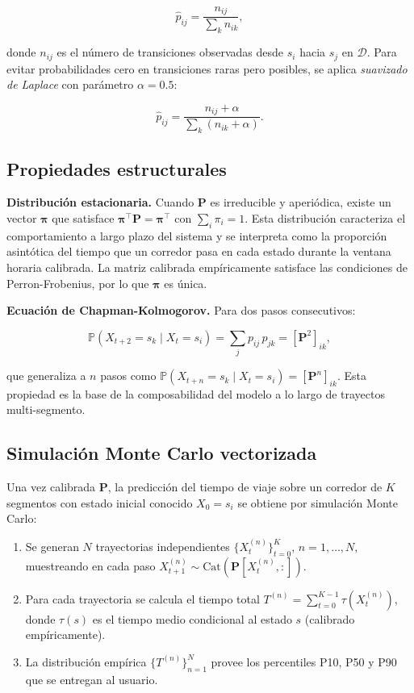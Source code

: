 \documentclass[11pt,a4paper]{article}
\newcommand{\Prob}{\mathbb{P}}
\begin{document}
\begin{equation}
\hat{p}_{ij} = \frac{n_{ij}}{\sum_k n_{ik}},
\end{equation}

donde $n_{ij}$ es el número de transiciones observadas desde
$s_i$ hacia $s_j$ en $\mathcal{D}$. Para evitar probabilidades
cero en transiciones raras pero posibles, se aplica
\emph{suavizado de Laplace} con parámetro $\alpha = 0.5$:

\begin{equation}
\hat{p}_{ij} = \frac{n_{ij} + \alpha}{\sum_k (n_{ik} + \alpha)}.
\end{equation}

\subsection{Propiedades estructurales}

\textbf{Distribución estacionaria.} Cuando $\mathbf{P}$ es
irreducible y aperiódica, existe un vector $\bm{\pi}$ que
satisface $\bm{\pi}^\top \mathbf{P} = \bm{\pi}^\top$ con
$\sum_i \pi_i = 1$. Esta distribución caracteriza el
comportamiento a largo plazo del sistema y se interpreta como la
proporción asintótica del tiempo que un corredor pasa en cada
estado durante la ventana horaria calibrada. La matriz calibrada
empíricamente satisface las condiciones de Perron-Frobenius, por
lo que $\bm{\pi}$ es única.

\textbf{Ecuación de Chapman-Kolmogorov.} Para dos pasos
consecutivos:

\begin{equation}
\Prob(X_{t+2}=s_k \mid X_t=s_i) = \sum_j p_{ij}\, p_{jk} =
[\mathbf{P}^2]_{ik},
\end{equation}

que generaliza a $n$ pasos como $\Prob(X_{t+n}=s_k \mid X_t=s_i)
= [\mathbf{P}^n]_{ik}$. Esta propiedad es la base de la
composabilidad del modelo a lo largo de trayectos multi-segmento.

\subsection{Simulación Monte Carlo vectorizada}

Una vez calibrada $\mathbf{P}$, la predicción del tiempo de viaje
sobre un corredor de $K$ segmentos con estado inicial conocido
$X_0 = s_i$ se obtiene por simulación Monte Carlo:

\begin{enumerate}
\item Se generan $N$ trayectorias independientes
$\{X_t^{(n)}\}_{t=0}^{K}$, $n=1,\ldots,N$, muestreando en cada
paso $X_{t+1}^{(n)} \sim \text{Cat}(\mathbf{P}[X_t^{(n)},:])$.
\item Para cada trayectoria se calcula el tiempo total
$T^{(n)} = \sum_{t=0}^{K-1} \tau(X_t^{(n)})$, donde
$\tau(s)$ es el tiempo medio condicional al estado $s$
(calibrado empíricamente).
\item La distribución empírica $\{T^{(n)}\}_{n=1}^N$ provee los
percentiles P10, P50 y P90 que se entregan al usuario.
\end{enumerate}
\end{document}
